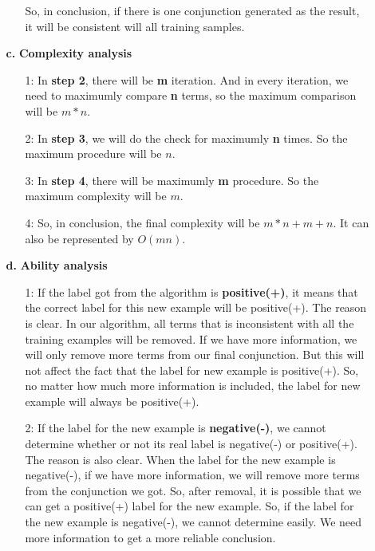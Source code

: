 \begin{enumerate}
\begin{enumerate}
\begin{enumerate}
So, in conclusion, if there is one conjunction generated as the result, it will be consistent will all training samples.\\
\end{enumerate}

\item[\bf{c.}] {\bf Complexity analysis}\\
\begin{enumerate}
\item[1: ] In {\bf step 2}, there will be {\bf m} iteration. And in every iteration, we need to maximumly compare {\bf n} terms, so the maximum comparison will be $m*n$.
\item[2: ]In {\bf step 3}, we will do the check for maximumly {\bf n} times. So the maximum procedure will be $n$.
\item[3: ]In {\bf step 4}, there will be maximumly {\bf m} procedure. So the maximum complexity will be $m$.
\item[4: ]So, in conclusion, the final complexity will be $m*n+m+n$. It can also be represented by $O(mn)$.\\
\end{enumerate}

\item[\bf{d.}] {\bf Ability analysis}\\

\begin{enumerate}
\item[1: ] If the label got from the algorithm is {\bf positive(+)}, it means that the correct label for this new example will be positive(+). The reason is clear. In our algorithm, all terms that is inconsistent with all the training examples will be removed. If we have more information, we will only remove more terms from our final conjunction. But this will not affect the fact that the label for new example is positive(+). So, no matter how much more information is included, the label for new example will always be positive(+).\\

\item[2: ] If the label for the new example is {\bf negative(-)}, we cannot determine whether or not its real label is negative(-) or positive(+). The reason is also clear. When the label for the new example is negative(-), if we have more information, we will remove more terms from the conjunction we got. So, after removal, it is possible that we can get a positive(+) label for the new example. So, if the label for the new example is negative(-), we cannot determine easily. We need more information to get a more reliable conclusion.\\
\end{enumerate}
\end{enumerate}


\end{enumerate}
